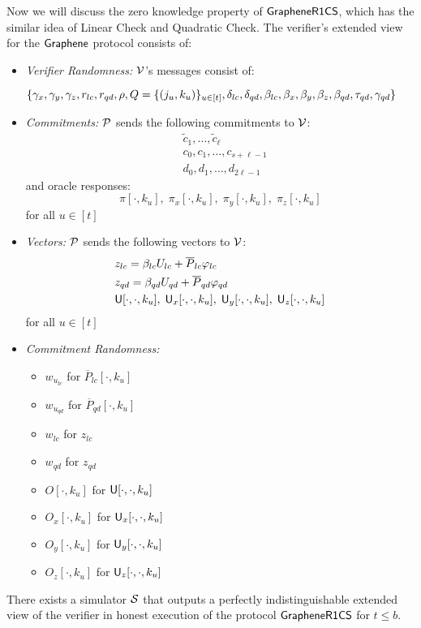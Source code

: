 \noindent Now we will discuss the zero knowledge property of $\mathsf{GrapheneR1CS}$, which has the similar idea of Linear Check and Quadratic Check.
The verifier's extended view for the $\textsf{Graphene}$ protocol consists of:
\begin{itemize}
	\item {\em Verifier Randomness:} $\mathcal{V}$'s messages consist of:
	
	$\{\gamma_x, \gamma_y, \gamma_z, r_{lc}, r_{qd}, \rho, Q=\{(j_u,k_u)\}_{u\in[t]},\\ \delta_{lc}, \delta_{qd}, \beta_{lc}, \beta_x, \beta_y, \beta_z, \beta_{qd}, \tau_{qd}, \gamma_{qd}\}$
	
	\item {\em Commitments:} $\mathcal{P}$ sends the following commitments to $\mathcal{V}$:
	\begin{align*}
		&\tilde{c}_1, \ldots, \tilde{c}_{\ell}\\
		&c_0, c_1, \ldots, c_{s+\ell-1}\\
		&d_0, d_1, \ldots, d_{2\ell-1}
	\end{align*}
	and oracle responses:
	$$\pi[\cdot,k_u],\; \pi_x[\cdot,k_u],\; \pi_y[\cdot, k_u],\; \pi_z[\cdot,k_u] $$
	for all $u\in[t]$
	
	\item {\em Vectors: } $\mathcal{P}$ sends the following vectors to $\mathcal{V}$:
	\begin{align*}
	&z_{lc}=\beta_{lc} U_{lc}+\overline{P}_{lc}\varphi_{lc}\\
	&z_{qd}=\beta_{qd} U_{qd}+\overline{P}_{qd}\varphi_{qd}\\
	&\mathsf{U}[\cdot,\cdot,k_u],\; \mathsf{U}_x[\cdot,\cdot,k_u],\; \mathsf{U}_y[\cdot, \cdot,k_u],\; \mathsf{U}_z[\cdot,\cdot,k_u] 
	\end{align*}
	for all $u\in[t]$
	\item {\em Commitment Randomness: }
	\begin{itemize}
		\item $w_{u_{lc}}$ for $\overline{P}_{lc}[\cdot,k_u]$
		\item $w_{u_{qd}}$ for $\overline{P}_{qd}[\cdot,k_u]$
		\item $w_{lc}$ for $z_{lc}$
		\item $w_{qd}$ for $z_{qd}$
		\item $O[\cdot, k_u]$ for $\mathsf{U}[\cdot,\cdot,k_u]$
		\item $O_x[\cdot, k_u]$ for $\mathsf{U}_x[\cdot,\cdot,k_u]$
		\item $O_y[\cdot, k_u]$ for $\mathsf{U}_y[\cdot,\cdot,k_u]$
		\item $O_z[\cdot, k_u]$ for $\mathsf{U}_z[\cdot,\cdot,k_u]$
	\end{itemize}
\end{itemize}
\begin{lemma}\label{lem:simgraphene}
	There exists a simulator $\mathcal{S}$ that outputs a perfectly indistinguishable extended view of the verifier in honest execution of the protocol $\mathsf{GrapheneR1CS}$ for $t\leq b$.
\end{lemma}

